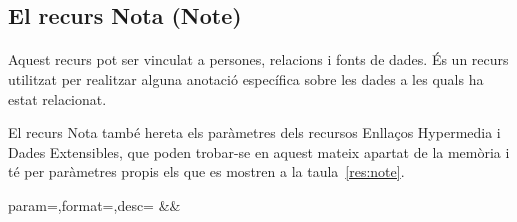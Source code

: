 \subsection{El recurs Nota (Note)}

    \paragraph{}
    Aquest recurs pot ser vinculat a persones, relacions i fonts de dades. És un recurs utilitzat per realitzar alguna anotació específica sobre les dades a les quals ha estat relacionat.

    El recurs Nota també hereta els paràmetres dels recursos Enllaços Hypermedia i Dades Extensibles, que poden trobar-se en aquest mateix apartat de la memòria i té per paràmetres propis els que es mostren a la taula~\ref{res:note}.

    \begin{center}
             {param=\param,format=\format,desc=\desc}
             {\param&\format&\desc}
     \end{center}
